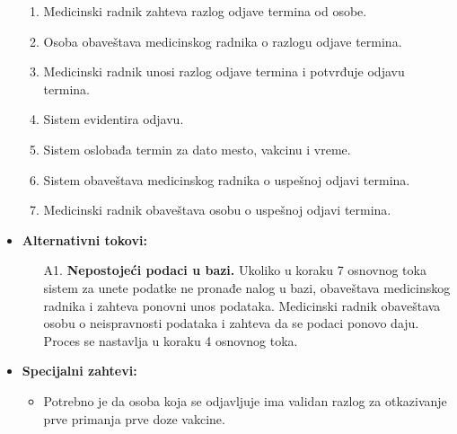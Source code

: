 \documentclass[titlepage]{article}
\begin{document}
\begin{itemize}
\begin{enumerate}
	    \item Medicinski radnik zahteva razlog odjave termina od osobe.
	    \item Osoba obaveštava medicinskog radnika o razlogu odjave termina.
	    \item Medicinski radnik unosi razlog odjave termina i potvrđuje odjavu termina.
	    \item Sistem evidentira odjavu.
	    \item Sistem oslobađa termin za dato mesto, vakcinu i vreme.
	    \item Sistem obaveštava medicinskog radnika o uspešnoj odjavi termina.
	    \item Medicinski radnik obaveštava osobu o uspešnoj odjavi termina.
	\end{enumerate}
     
    
    \item \textbf{Alternativni tokovi:}
        \begin{itemize}
            \item[A1.] \textbf{Nepostojeći podaci u bazi.} Ukoliko u koraku 7 osnovnog toka sistem za unete podatke ne pronađe nalog u bazi, obaveštava medicinskog radnika i zahteva ponovni unos podataka. Medicinski radnik obaveštava osobu o neispravnosti podataka i zahteva da se podaci ponovo daju. Proces se nastavlja u koraku 4 osnovnog toka.
        \end{itemize}
    
    \item \textbf{Specijalni zahtevi:}
		\begin{itemize}
			\item Potrebno je da osoba koja se odjavljuje ima validan razlog za otkazivanje prve primanja prve doze vakcine.
		\end{itemize}
\end{itemize}
\end{document}
